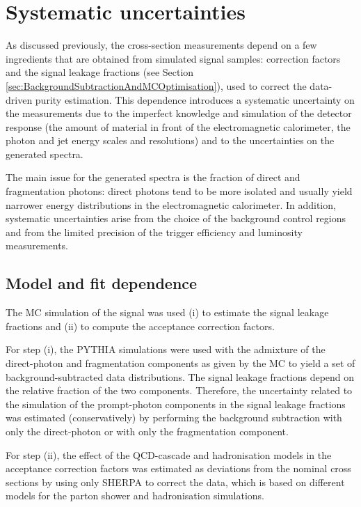 \documentclass[12pt, twoside]{article}
\numberwithin{equation}{section}
\numberwithin{figure}{section}
\begin{document}
\section{Systematic uncertainties}
\label{sec:SystematicUncertainties}
\vspace{1.0cm}

As discussed previously, the cross-section measurements depend on a few ingredients that are obtained from simulated signal samples: correction factors and the signal leakage fractions (see Section \ref{sec:BackgroundSubtractionAndMCOptimisation}), used to correct the data-driven purity estimation. This dependence introduces a systematic uncertainty on the measurements due to the imperfect knowledge and simulation of the detector response (the amount of material in front of the electromagnetic calorimeter, the photon and jet energy scales and resolutions) and to the uncertainties on the generated spectra.

The main issue for the generated spectra is the fraction of direct and fragmentation photons: direct photons tend to be more isolated and usually yield narrower energy distributions in the electromagnetic calorimeter. In addition, systematic uncertainties arise from the choice of the background control regions and from the limited precision of the trigger efficiency and luminosity measurements.

\subsection{Model and fit dependence}
\label{subsec:ModelAndFirDependence}

The MC simulation of the signal was used (i) to estimate the signal leakage fractions and (ii) to compute the acceptance correction factors.

For step (i), the PYTHIA simulations were used with the admixture of the direct-photon and fragmentation components as given by the MC to yield a set of background-subtracted data distributions. The signal leakage fractions depend on the relative fraction of the two components. Therefore, the uncertainty related to the simulation of the prompt-photon components in the signal leakage fractions was estimated (conservatively) by performing the background subtraction with only the direct-photon or with only the fragmentation component.

For step (ii), the effect of the QCD-cascade and hadronisation models in the acceptance correction factors was estimated as deviations from the nominal cross sections by using only SHERPA to correct the data, which is based on different models for the parton shower and hadronisation simulations.
\end{document}
